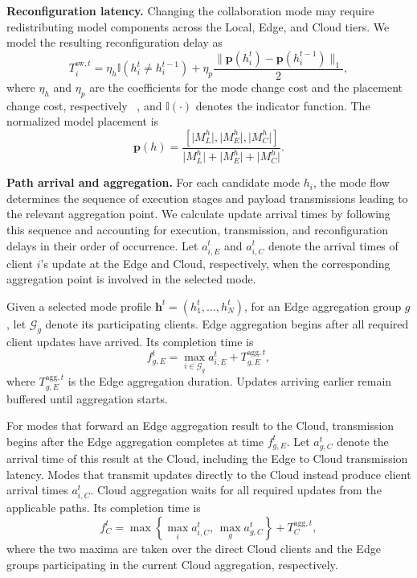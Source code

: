 \documentclass[5p,times]{elsarticle}
\theoremstyle{plain}
\theoremstyle{definition}
\theoremstyle{remark}
\begin{document}
\textbf{Reconfiguration latency.}
Changing the collaboration mode may require
redistributing model components across the
Local, Edge, and Cloud tiers.
We model the resulting reconfiguration delay as
\begin{equation}
T_i^{\mathrm{sw},t}
=
\eta_h \mathbb{I}(h_i^t\neq h_i^{t-1})
+
\eta_p
\frac{
\|\mathbf{p}(h_i^t)-\mathbf{p}(h_i^{t-1})\|_1
}{2},
\label{eq:switching_cost}
\end{equation}
where $\eta_h$ and $\eta_p$ are the coefficients
for the mode change cost and the placement
change cost, respectively
~\cite{CHEN2026112204,li2026latency},
and $\mathbb{I}(\cdot)$ denotes the indicator function. The normalized model placement is
\begin{equation}
\mathbf{p}(h)
=
\frac{
\left[
\lvert M_L^{h}\rvert,
\lvert M_E^{h}\rvert,
\lvert M_C^{h}\rvert
\right]
}{
\lvert M_L^{h}\rvert+
\lvert M_E^{h}\rvert+
\lvert M_C^{h}\rvert
}.
\label{eq:model_placement_vector}
\end{equation}

\textbf{Path arrival and aggregation.}
For each candidate mode \(h_i\), the mode flow
determines the sequence of execution stages
and payload transmissions leading to the
relevant aggregation point.
We calculate update arrival times by
following this sequence and accounting for
execution, transmission, and reconfiguration
delays in their order of occurrence.
Let \(a_{i,E}^t\) and \(a_{i,C}^t\) denote
the arrival times of client \(i\)'s update
at the Edge and Cloud, respectively,
when the corresponding aggregation point
is involved in the selected mode.

Given a selected mode profile
$\mathbf h^t=(h_1^t,\ldots,h_N^t)$,
for an Edge aggregation group $g$,
let \(\mathcal G_g\) denote its
participating clients.
Edge aggregation begins after all required
client updates have arrived.
Its completion time is
\begin{equation}
f_{g,E}^t
=
\max_{i\in\mathcal G_g} a_{i,E}^t
+
T_{g,E}^{\mathrm{agg},t},
\label{eq:edge_agg_finish}
\end{equation}
where \(T_{g,E}^{\mathrm{agg},t}\) is the Edge aggregation duration. Updates arriving earlier remain buffered until aggregation starts.

For modes that forward an Edge aggregation
result to the Cloud, transmission begins
after the Edge aggregation completes at
time \(f_{g,E}^t\).
Let \(a_{g,C}^t\) denote the arrival time
of this result at the Cloud, including
the Edge to Cloud transmission latency.
Modes that transmit updates directly
to the Cloud instead produce client
arrival times \(a_{i,C}^t\).
Cloud aggregation waits for all required
updates from the applicable paths.
Its completion time is
\begin{equation}
f_C^t
=
\max\left\{
\max_i a_{i,C}^t,\,
\max_g a_{g,C}^t
\right\}
+
T_C^{\mathrm{agg},t},
\label{eq:cloud_agg_finish}
\end{equation}
where the two maxima are taken over the direct Cloud clients and the Edge
groups participating in the current Cloud aggregation, respectively.
\end{document}
